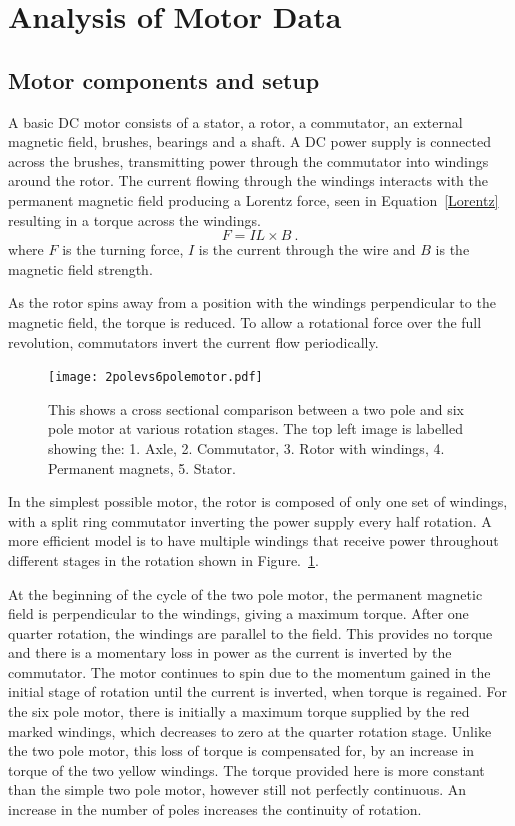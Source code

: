 \section{Analysis of Motor Data}
\label{sec:analysis}

\subsection{Motor components and setup}

A basic DC motor consists of a stator, a rotor, a commutator, an external magnetic field, brushes, bearings and a shaft. A DC power supply is connected across the brushes, transmitting power through the commutator into windings around the rotor. The current flowing through the windings interacts with the permanent magnetic field producing a Lorentz force, seen in Equation~\eqref{Lorentz} resulting in a torque across the windings.
\begin{equation}
    F = I L \times B~.
    \label{Lorentz}
\end{equation}
where $F$ is the turning force, $I$ is the current through the wire and $B$ is the magnetic field strength.

As the rotor spins away from a position with the windings perpendicular to the magnetic field, the torque is reduced. To allow a rotational force over the full revolution, commutators invert the current flow periodically. 

\begin{figure}
    \centering
    \texttt{[image: 2polevs6polemotor.pdf]}
    \caption[DC motor cross sectional comparison]{This shows a cross sectional comparison between a two pole and six pole motor at various rotation stages. The top left image is labelled showing the: 1. Axle, 2. Commutator, 3. Rotor with windings, 4. Permanent magnets, 5. Stator.}
    \label{fig:2pole_vs_6pole}
\end{figure}

In the simplest possible motor, the rotor is composed of only one set of windings, with a split ring commutator inverting the power supply every half rotation. A more efficient model is to have multiple windings that receive power throughout different stages in the rotation shown in Figure.~\ref{fig:2pole_vs_6pole}. 

At the beginning of the cycle of the two pole motor, the permanent magnetic field is perpendicular to the windings, giving a maximum torque. After one quarter rotation, the windings are parallel to the field. This provides no torque and there is a momentary loss in power as the current is inverted by the commutator. The motor continues to spin due to the momentum gained in the initial stage of rotation until the current is inverted, when torque is regained. For the six pole motor, there is initially a maximum torque supplied by the red marked windings, which decreases to zero at the quarter rotation stage. Unlike the two pole motor, this loss of torque is compensated for, by an increase in torque of the two yellow windings. The torque provided here is more constant than the simple two pole motor, however still not perfectly continuous. An increase in the number of poles increases the continuity of rotation.

